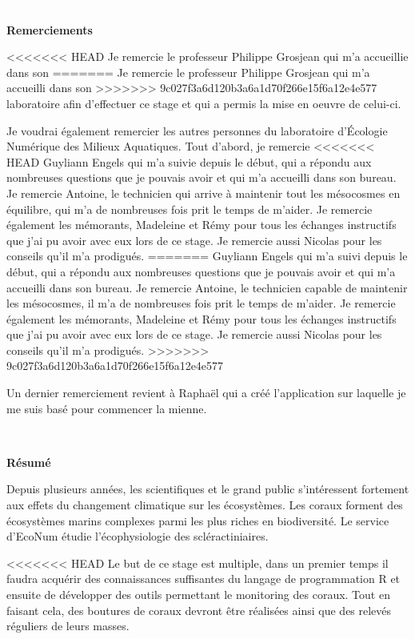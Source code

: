 \documentclass[]{report}
\begin{document}
\null
\newpage

\textcolor{white}{.}

\Huge 
{\bf Remerciements} \vspace{1 cm}

\normalsize
<<<<<<< HEAD
Je remercie le professeur Philippe Grosjean qui m'a accueillie dans son
=======
Je remercie le professeur Philippe Grosjean qui m'a accueilli dans son
>>>>>>> 9c027f3a6d120b3a6a1d70f266e15f6a12e4e577
laboratoire afin d'effectuer ce stage et qui a permis la mise en oeuvre
de celui-ci.

Je voudrai également remercier les autres personnes du laboratoire
d'Écologie Numérique des Milieux Aquatiques. Tout d'abord, je remercie
<<<<<<< HEAD
Guyliann Engels qui m'a suivie depuis le début, qui a répondu aux
nombreuses questions que je pouvais avoir et qui m'a accueilli dans son
bureau. Je remercie Antoine, le technicien qui arrive à maintenir tout
les mésocosmes en équilibre, qui m'a de nombreuses fois prit le temps de
m'aider. Je remercie également les mémorants, Madeleine et Rémy pour
tous les échanges instructifs que j'ai pu avoir avec eux lors de ce
stage. Je remercie aussi Nicolas pour les conseils qu'il m'a prodigués.
=======
Guyliann Engels qui m'a suivi depuis le début, qui a répondu aux
nombreuses questions que je pouvais avoir et qui m'a accueilli dans son
bureau. Je remercie Antoine, le technicien capable de maintenir les
mésocosmes, il m'a de nombreuses fois prit le temps de m'aider. Je
remercie également les mémorants, Madeleine et Rémy pour tous les
échanges instructifs que j'ai pu avoir avec eux lors de ce stage. Je
remercie aussi Nicolas pour les conseils qu'il m'a prodigués.
>>>>>>> 9c027f3a6d120b3a6a1d70f266e15f6a12e4e577

Un dernier remerciement revient à Raphaël qui a créé l'application sur
laquelle je me suis basé pour commencer la mienne. \vfill
\null
\newpage

\textcolor{white}{.}

\Huge 
{\bf Résumé} \vspace{1 cm}

\normalsize

Depuis plusieurs années, les scientifiques et le grand public
s'intéressent fortement aux effets du changement climatique sur les
écosystèmes. Les coraux forment des écosystèmes marins complexes parmi
les plus riches en biodiversité. Le service d'EcoNum étudie
l'écophysiologie des scléractiniaires.

<<<<<<< HEAD
Le but de ce stage est multiple, dans un premier temps il faudra
acquérir des connaissances suffisantes du langage de programmation R et
ensuite de développer des outils permettant le monitoring des coraux.
Tout en faisant cela, des boutures de coraux devront être réalisées
ainsi que des relevés réguliers de leurs masses.
\end{document}
